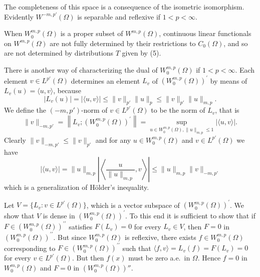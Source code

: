 The completeness of this space is a consequence of the isometric isomorphism. Evidently $W^{-m, p'}(\Omega)$ is separable and reflexive if $1<p<\infty$.

When $W_0^{m, p}(\Omega)$ is a proper subset of $W^{m,p}(\Omega)$, continuous linear functionals on $W^{m,p}(\Omega)$ are not fully determined by their restrictions to $C_0(\Omega)$, and so are not determined by distributions $T$ given by (5).


\begin{para}
  There is another way of characterizing the dual of $W_0^{m, p}(\Omega)$ if $1<p<\infty$.
  Each element $v \in L^{p'}(\Omega)$ determines an element $L_v$
  of $\left(W_0^{m, p}(\Omega)\right)^{\prime}$ by means of $L_v(u)=\langle u, v\rangle$,
  because
  \[
  \left|L_v(u)\right|=|\langle u, v\rangle| \leq\|v\|_{p'}\|u\|_p \leq\|v\|_{p'}\|u\|_{m, p} .
  \]
  We define the $\left(-m, p'\right)$-norm of $v \in L^{p'}(\Omega)$ to be the norm of $L_v$, that is
  \[
  \|v\|_{-m, p'}
    = \left\|L_v ;\left(W_0^{m, p}(\Omega)\right)^{\prime}\right\|
    = \sup_{u \in W_0^{m, p}(\Omega),\|u\|_{m, p} \leq 1}|\langle u, v\rangle| .
  \]
  Clearly $\|v\|_{-m, p'} \leq\|v\|_{p'}$ and for any $u \in W_0^{m, p}(\Omega)$ and $v \in L^{p'}(\Omega)$ we have
  \begin{equation}\label{eq:3.6}
  |\langle u, v\rangle|=\|u\|_{m, p}\left|\left\langle\frac{u}{\|u\|_{m, p}}, v\right\rangle\right| \leq\|u\|_{m, p}\|v\|_{-m, p'}
  \end{equation}
  which is a generalization of Hölder's inequality.

  Let $V = \{L_v: v \in L^{p'}(\Omega)\}$, which is a vector subspace of
  $\left(W_0^{m, p}(\Omega)\right)^{\prime}$.
  We show that $V$ is dense in $\left(W_0^{m, p}(\Omega)\right)^{\prime}$.
  To this end it is sufficient to show that if
  $F \in\left(W_0^{m, p}(\Omega)\right)^{\prime \prime}$ satisfies $F\left(L_v\right)=0$
  for every $L_v \in V$, then $F=0$ in $\left(W_0^{m, p}(\Omega)\right)^{\prime \prime}$.
  But since $W_0^{m, p}(\Omega)$ is reflexive, there exists $f \in W_0^{m, p}(\Omega)$ corresponding to $F \in\left(W_0^{m, p}(\Omega)\right)^{\prime \prime}$
  such that $\langle f, v\rangle=L_v(f)=F\left(L_v\right)=0$ for every $v \in L^{p'}(\Omega)$.
  But then $f(x)$ must be zero a.e.~in $\Omega$. Hence $f=0$ in $W_0^{m, p}(\Omega)$ and 
  $F=0$ in $(W_0^{m, p}(\Omega))''$.
  

\end{para}
